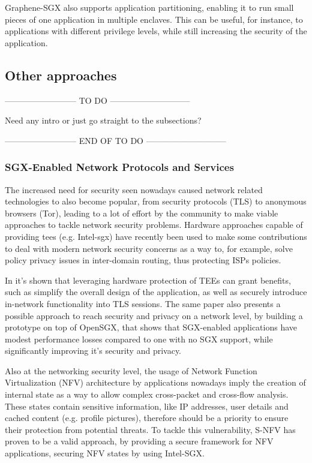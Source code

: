 Graphene-SGX also supports application partitioning, enabling it to run small pieces of one application in multiple enclaves. This can be useful, for instance, to applications with different privilege levels, while still increasing the security of the application.
\subsection{Other approaches}

-------------------------- TO DO -----------------------------


Need any intro or just go straight to the subsections?

-------------------------- END OF TO DO -----------------------------


\subsubsection{SGX-Enabled Network Protocols and Services}

The increased need for security seen nowadays caused network related technologies to also become popular, from security protocols (TLS) to anonymous browsers (Tor), leading to a lot of effort by the community to make viable approaches to tackle network security problems. 
Hardware approaches capable of providing \gls{tee}s (e.g. Intel-\gls{sgx}) have recently been used to make some contributions to deal with modern network security concerns as a way to, for example, solve policy privacy issues in inter-domain routing, thus protecting ISPs policies.

In \cite{torSGXPaper} it’s shown that leveraging hardware protection of TEEs can grant benefits, such as simplify the overall design of the application, as well as securely introduce in-network functionality into TLS sessions. The same paper also presents a possible approach to reach security and privacy on a network level, by building a prototype on top of OpenSGX, that shows that SGX-enabled applications have modest performance losses compared to one with no SGX support, while significantly improving it’s security and privacy.

Also at the networking security level, the usage of Network Function Virtualization (NFV) architecture by applications nowadays imply the creation of internal state as a way to allow complex cross-packet and cross-flow analysis. 
These states contain sensitive information, like IP addresses, user details and cached content (e.g. profile pictures), therefore should be a priority to ensure their protection from potential threats.
To tackle this vulnerability, S-NFV \cite{sNFVPaper} has proven to be a valid approach, by providing a secure framework for NFV applications, securing NFV states by using Intel-SGX.

